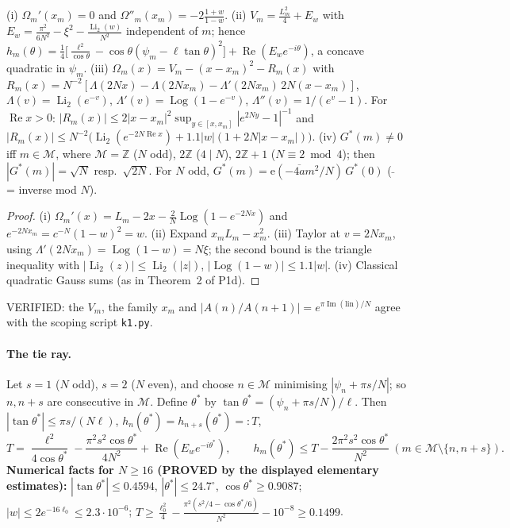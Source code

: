 \documentclass[11pt]{article}
\theoremstyle{definition}\newtheorem{definition}[theorem]{Definition}
\theoremstyle{remark}\newtheorem{remark}[theorem]{Remark}
\newcommand{\e}{\mathrm{e}}
\newcommand{\Li}{\operatorname{Li}_2}
\begin{document}
\begin{lemma}\label{lem:saddle}
(i) $\Omega_m'(x_m)=0$ and $\Omega''_m(x_m)=-2\frac{1+w}{1-w}$.
(ii) $V_m=\frac{L_m^2}4+E_w$ with $E_w=\frac{\pi^2}{6N^2}-\xi^2-\frac{\Li(w)}{N^2}$ independent of $m$; hence
$h_m(\theta)=\frac14\big[\frac{\ell^2}{\cos\theta}-\cos\theta(\psi_m-\ell\tan\theta)^2\big]+\operatorname{Re}(E_we^{-i\theta})$, a concave quadratic in $\psi_m$.
(iii) $\Omega_m(x)=V_m-(x-x_m)^2-R_m(x)$ with $R_m(x)=N^{-2}[\Lambda(2Nx)-\Lambda(2Nx_m)-\Lambda'(2Nx_m)\,2N(x-x_m)]$, $\Lambda(v)=\Li(e^{-v})$, $\Lambda'(v)=\operatorname{Log}(1-e^{-v})$, $\Lambda''(v)=1/(e^v-1)$. For $\operatorname{Re}x>0$:
$|R_m(x)|\le2|x-x_m|^2\sup_{y\in[x,x_m]}|e^{2Ny}-1|^{-1}$ and $|R_m(x)|\le N^{-2}\big(\Li(e^{-2N\operatorname{Re}x})+1.1|w|(1+2N|x-x_m|)\big)$.
(iv) $G^*(m)\neq0$ iff $m\in\mathcal M$, where $\mathcal M=\mathbb Z$ ($N$ odd), $2\mathbb Z$ ($4\mid N$), $2\mathbb Z+1$ ($N\equiv2\bmod4$); then $|G^*(m)|=\sqrt N$ resp.\ $\sqrt{2N}$. For $N$ odd, $G^*(m)=\e(-\overline{4a}m^2/N)\,G^*(0)$ ($\bar{\ }$ = inverse mod $N$).
\end{lemma}
\begin{proof}
(i) $\Omega_m'(x)=L_m-2x-\frac2N\operatorname{Log}(1-e^{-2Nx})$ and $e^{-2Nx_m}=c^{-N}(1-w)^2=w$. (ii) Expand $x_mL_m-x_m^2$. (iii) Taylor at $v=2Nx_m$, using $\Lambda'(2Nx_m)=\operatorname{Log}(1-w)=N\xi$; the second bound is the triangle inequality with $|\Li(z)|\le\Li(|z|)$, $|\operatorname{Log}(1-w)|\le1.1|w|$. (iv) Classical quadratic Gauss sums (as in Theorem~2 of P1d).
\end{proof}
VERIFIED: the $V_m$, the family $x_m$ and $|A(n)/A(n+1)|=e^{\pi\operatorname{Im}(\mathrm{lin})/N}$ agree with the scoping script \texttt{k1.py}.

\paragraph{The tie ray.} Let $s=1$ ($N$ odd), $s=2$ ($N$ even), and choose $n\in\mathcal M$ minimising $|\psi_n+\pi s/N|$; so $n,n+s$ are consecutive in $\mathcal M$. Define $\theta^*$ by $\tan\theta^*=(\psi_n+\pi s/N)/\ell$. Then $|\tan\theta^*|\le\pi s/(N\ell)$, $h_n(\theta^*)=h_{n+s}(\theta^*)=:T$,
\[T=\frac{\ell^2}{4\cos\theta^*}-\frac{\pi^2s^2\cos\theta^*}{4N^2}+\operatorname{Re}(E_we^{-i\theta^*}),\qquad h_m(\theta^*)\le T-\frac{2\pi^2s^2\cos\theta^*}{N^2}\ (m\in\mathcal M\setminus\{n,n+s\}).\]
\textbf{Numerical facts for $N\ge16$ (PROVED by the displayed elementary estimates):} $|\tan\theta^*|\le0.4594$, $|\theta^*|\le24.7^\circ$, $\cos\theta^*\ge0.9087$; $|w|\le2e^{-16\ell_0}\le2.3\cdot10^{-6}$; $T\ge\frac{\ell_0^2}4-\frac{\pi^2(s^2/4-\cos\theta^*/6)}{N^2}-10^{-8}\ge0.1499$.
\end{document}
